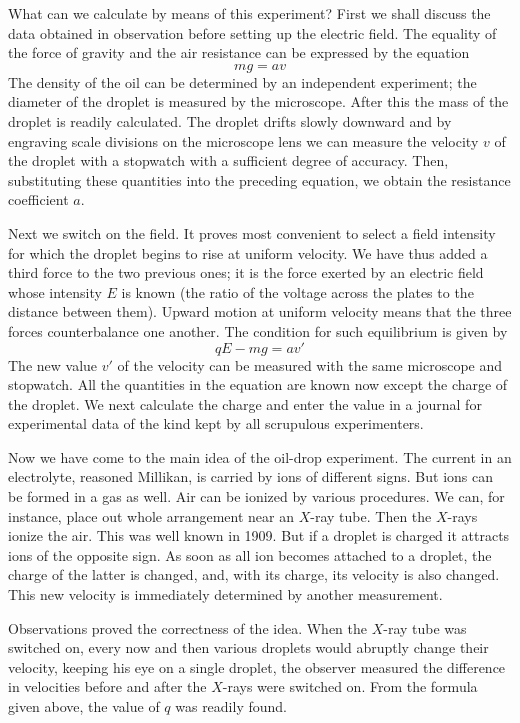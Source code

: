 What can we calculate by means of this experiment? First we shall discuss the data obtained in observation before setting up the electric field. The equality of the force of gravity and the air resistance can be expressed by the equation
\begin{equation*}%
mg=av
\end{equation*}
The density of the oil can be determined by an independent experiment; the diameter of the droplet is measured by the microscope. After this the mass of the droplet is readily calculated. The droplet drifts slowly downward and by engraving scale divisions on the microscope lens we can measure the velocity $v$ of the droplet with a stopwatch with a sufficient degree of accuracy. Then, substituting these quantities into the preceding equation, we obtain the resistance coefficient $a$.

Next we switch on the field. It proves most convenient to select a field intensity for which the droplet begins to rise at uniform velocity. We have thus added a third force to the two previous ones; it is the force exerted by an electric field whose intensity $E$ is known (the ratio of the voltage across the plates to the distance between them). Upward motion at uniform velocity means that the three forces counterbalance one another. The condition for such equilibrium is given by
\begin{equation*}%
qE - mg = av'
\end{equation*}
The new value $v'$ of the velocity can be measured with the same microscope and stopwatch. All the quantities in the equation are known now except the charge of the droplet. We next calculate the charge and enter the value in a journal for experimental data of the kind kept by all scrupulous experimenters.

Now we have come to the main idea of the oil-drop experiment. The current in an electrolyte, reasoned Millikan, is carried by ions of different signs. But ions can be formed in a gas as well. Air can be ionized by various procedures. We can, for instance, place out whole arrangement near an $X$-ray tube. Then the $X$-rays ionize the air. This was well known in 1909. But if a droplet is charged it attracts ions of the opposite sign. As soon as all ion becomes attached to a droplet, the charge of the latter is changed, and, with its charge, its velocity is also changed. This new velocity is immediately determined by another measurement.

Observations proved the correctness of the idea. When the $X$-ray tube was switched on, every now and then various droplets would abruptly change their velocity, keeping his eye on a single droplet, the observer measured the difference in velocities before and after the $X$-rays were switched on. From the formula given above, the value of $q$ was readily found.

